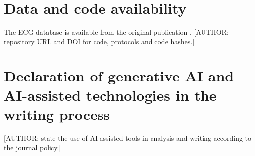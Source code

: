 \documentclass[preprint,12pt]{elsarticle}
\begin{document}
\section*{Data and code availability}
The ECG database is available from the original publication \cite{zheng2020dataset}. [AUTHOR: repository URL and DOI for code, protocols and code hashes.]

\section*{Declaration of generative AI and AI-assisted technologies in the writing process}
[AUTHOR: state the use of AI-assisted tools in analysis and writing according to the journal policy.]



\end{document}

